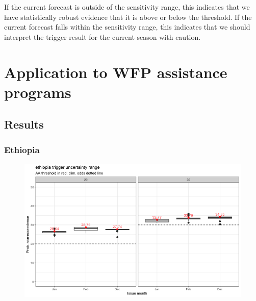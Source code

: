 \documentclass{ametsocV5}
\begin{document}
If the current forecast is outside of the sensitivity range, this indicates that we have statistically robust evidence that it is above or below the threshold. If the current forecast falls within the sensitivity range, this indicates that we should interpret the trigger result for the current season with caution.


\section{Application to WFP assistance programs}

\subsection{Results}








\subsubsection{Ethiopia}

\begin{figure}
    \centering
    \includegraphics[width=0.9\linewidth]{figures/ethiopia.png}
\end{figure}
\end{document}
